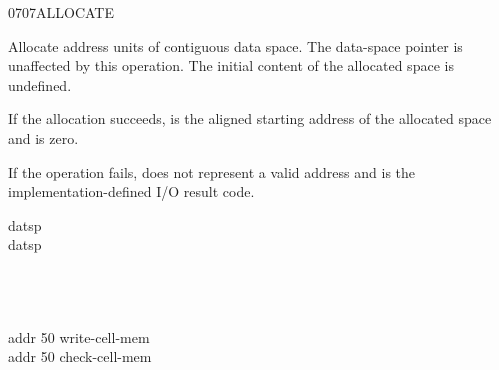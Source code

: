 \enlargethispage{2ex}
\begin{worddef}{0707}{ALLOCATE}
\item {}

	Allocate  address units of contiguous data space. The
	data-space pointer is unaffected by this operation. The initial
	content of the allocated space is undefined.

	If the allocation succeeds,  is the aligned
	starting address of the allocated space and  is
	zero.

	If the operation fails,  does not represent a valid
	address and  is the {im\-ple\-ment\-ation-de\-fin\-ed} I/O result
	code.


	\begin{testing} %
		\ttfamily
		 datsp \\
		 datsp \word{!}

		 \\
						\tab {}  \\
										\tab[5.9]  \\
		addr  50 write-cell-mem \\
		addr  50 check-cell-mem \tab[3.5]   \\

		 \\
		 \tab {}  \\
		 \\
										\tab[5.9]  \\

		 \tab {} 
	\end{testing}
\end{worddef}

